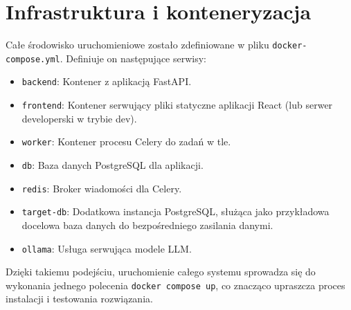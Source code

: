 \section*{Infrastruktura i konteneryzacja}
Całe środowisko uruchomieniowe zostało zdefiniowane w pliku \texttt{docker-compose.yml}. Definiuje on następujące serwisy:
\begin{itemize}
    \item \texttt{backend}: Kontener z aplikacją FastAPI.
    \item \texttt{frontend}: Kontener serwujący pliki statyczne aplikacji React (lub serwer developerski w trybie dev).
    \item \texttt{worker}: Kontener procesu Celery do zadań w tle.
    \item \texttt{db}: Baza danych PostgreSQL dla aplikacji.
    \item \texttt{redis}: Broker wiadomości dla Celery.
    \item \texttt{target-db}: Dodatkowa instancja PostgreSQL, służąca jako przykładowa docelowa baza danych do bezpośredniego zasilania danymi.
    \item \texttt{ollama}: Usługa serwująca modele \gls{LLM}.
\end{itemize}

Dzięki takiemu podejściu, uruchomienie całego systemu sprowadza się do wykonania jednego polecenia \texttt{docker compose up}, co znacząco upraszcza proces instalacji i testowania rozwiązania.